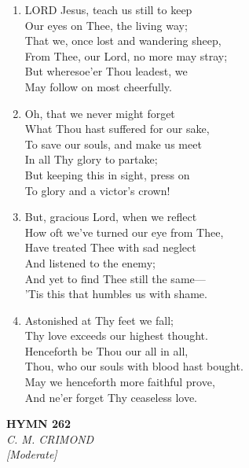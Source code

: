 \documentclass[11pt,a4paper]{article}
\begin{document}
\begin{enumerate}
    \item LORD Jesus, teach us still to keep \\
        Our eyes on Thee, the living way; \\
        That we, once lost and wandering sheep, \\
        From Thee, our Lord, no more may stray; \\
        But wheresoe'er Thou leadest, we \\
        May follow on most cheerfully.

    \item Oh, that we never might forget \\
        What Thou hast suffered for our sake, \\
        To save our souls, and make us meet \\
        In all Thy glory to partake; \\
        But keeping this in sight, press on \\
        To glory and a victor's crown!

    \item But, gracious Lord, when we reflect \\
        How oft we've turned our eye from Thee, \\
        Have treated Thee with sad neglect \\
        And listened to the enemy; \\
        And yet to find Thee still the same--- \\
        'Tis this that humbles us with shame.

    \item Astonished at Thy feet we fall; \\
        Thy love exceeds our highest thought. \\
        Henceforth be Thou our all in all, \\
        Thou, who our souls with blood hast bought. \\
        May we henceforth more faithful prove, \\
        And ne'er forget Thy ceaseless love.

\end{enumerate}

\newpage
\begin{center}
    {\Large \textbf{HYMN 262}}
    \\
    \textit{C. M. CRIMOND}
    \\
    \textit{\small [Moderate]}
\end{center}
\vspace{1em}
\end{document}
